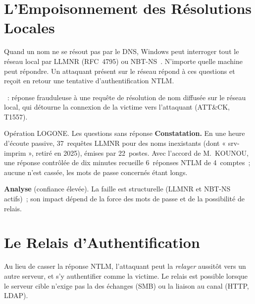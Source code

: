 \section{L'Empoisonnement des Résolutions Locales}
\label{sec:c09-llmnr}

Quand un nom ne se résout pas par le DNS, Windows peut interroger tout le
réseau local par LLMNR (RFC~4795) ou NBT-NS~\cite{rfc4795}. N'importe quelle
machine peut répondre. Un attaquant présent sur le réseau répond à ces
questions et reçoit en retour une tentative d'authentification NTLM.

\begin{boxdef}
~: réponse frauduleuse à une
requête de résolution de nom diffusée sur le réseau local, qui détourne la
connexion de la victime vers l'attaquant (ATT\&CK, T1557).
\end{boxdef}

\begin{boxscenario}{Opération LOGONE. Les questions sans réponse}
\textbf{Constatation.} En une heure d'écoute passive, 37~requêtes LLMNR
pour des noms inexistants (dont « srv-imprim », retiré en 2025), émises par
22~postes. Avec l'accord de M.~KOUNOU, une réponse contrôlée de dix minutes
recueille 6~réponses NTLM de 4~comptes~; aucune n'est cassée, les mots de
passe concernés étant longs.

\medskip
\textbf{Analyse} (confiance élevée). La faille est structurelle (LLMNR et
NBT-NS actifs)~; son impact dépend de la force des mots de passe et de la
possibilité de relais.
\end{boxscenario}

\section{Le Relais d'Authentification}
\label{sec:c09-relais}

Au lieu de casser la réponse NTLM, l'attaquant peut la \emph{relayer}
aussitôt vers un autre serveur, et s'y authentifier comme la victime. Le
relais est possible lorsque le serveur cible n'exige pas la
 des échanges (SMB) ou la liaison au canal (HTTP,
LDAP).

